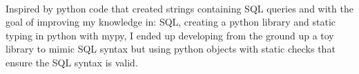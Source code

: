 \documentclass[a4paper]{MagicalCV}
\begin{document}
\begin{minipage}[t]{0.64\textwidth}

 \\
 Inspired by python code that created strings containing SQL queries and with the goal of improving my knowledge in: SQL, creating a python library and static typing in python with mypy, I ended up developing from the ground up a toy library to mimic SQL syntax but using python objects with static checks that ensure the SQL syntax is valid.
\sectionsep

\end{minipage} 

\printbibliography
\end{document}

